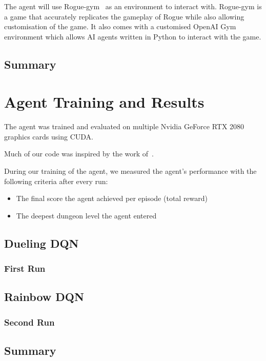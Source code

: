 \documentclass[12pt,a4paper]{article}
\begin{document}
    The agent will use Rogue-gym~\citep{kanagawa19} as an environment to interact with.
    Rogue-gym is a game that accurately replicates the gameplay of Rogue while also allowing customisation of the game.
    It also comes with a customised OpenAI Gym environment which allows AI agents written in Python to interact with the game.

    \subsection{Summary}\label{subsec:summary2} %

    \section{Agent Training and Results}\label{sec:agent-training-and-results}  %
    The agent was trained and evaluated on multiple Nvidia GeForce RTX 2080 graphics cards using CUDA.

    Much of our code was inspired by the work of~\citet{sebtheiler}.

    During our training of the agent, we measured the agent's performance with the following criteria after every run:

    \begin{itemize}
        \item The final score the agent achieved per episode (total reward)
        \item The deepest dungeon level the agent entered
    \end{itemize}

    \subsection{Dueling DQN}\label{subsec:dueling-dqn}
    \subsubsection{First Run}

    \subsection{Rainbow DQN}\label{subsec:rainbow-dqn}
    \subsubsection{Second Run}

    \subsection{Summary}\label{subsec:summary}
\end{document}
